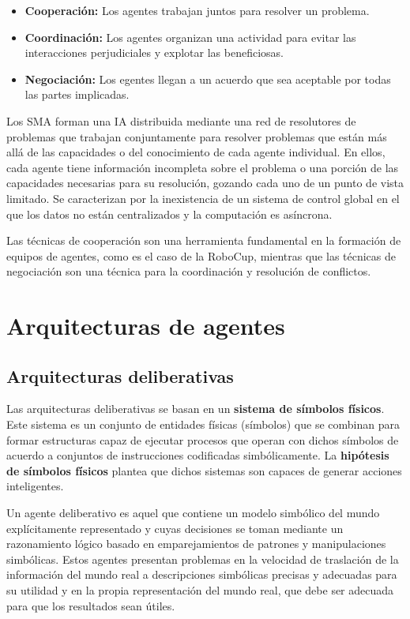 \begin{itemize}
	\item\textbf{Cooperación:} Los agentes trabajan juntos para resolver un problema.
	\item\textbf{Coordinación:} Los agentes organizan una actividad para evitar las interacciones perjudiciales y explotar las beneficiosas.
	\item\textbf{Negociación:} Los egentes llegan a un acuerdo que sea aceptable por todas las partes implicadas.
\end{itemize}

Los SMA forman una IA distribuida mediante una red de resolutores de problemas que trabajan conjuntamente para resolver problemas que están más allá de las capacidades o del conocimiento de cada agente individual.
En ellos, cada agente tiene información incompleta sobre el problema o una porción de las capacidades necesarias para su resolución, gozando cada uno de un punto de vista limitado.
Se caracterizan por la inexistencia de un sistema de control global en el que los datos no están centralizados y la computación es asíncrona.

Las técnicas de cooperación son una herramienta fundamental en la formación de equipos de agentes, como es el caso de la RoboCup, mientras que las técnicas de negociación son una técnica para la coordinación y resolución de conflictos.

\section{Arquitecturas de agentes}

\subsection{Arquitecturas deliberativas}

Las arquitecturas deliberativas se basan en un \textbf{sistema de símbolos físicos}.
Este sistema es un conjunto de entidades físicas (símbolos) que se combinan para formar estructuras capaz de ejecutar procesos que operan con dichos símbolos de acuerdo a conjuntos de instrucciones codificadas simbólicamente.
La \textbf{hipótesis de símbolos físicos} plantea que dichos sistemas son capaces de generar acciones inteligentes.

Un agente deliberativo es aquel que contiene un modelo simbólico del mundo explícitamente representado y cuyas decisiones se toman mediante un razonamiento lógico basado en emparejamientos de patrones y manipulaciones simbólicas.
Estos agentes presentan problemas en la velocidad de traslación de la información del mundo real a descripciones simbólicas precisas y adecuadas para su utilidad y en la propia representación del mundo real, que debe ser adecuada para que los resultados sean útiles.

